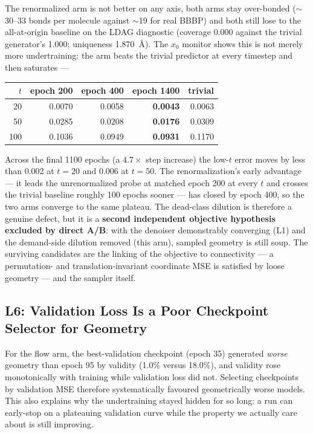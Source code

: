 \documentclass[12pt, a4paper]{article}
\begin{document}
The renormalized arm is not better on any axis, both arms stay over-bonded
($\sim$30--33 bonds per molecule against $\sim$19 for real BBBP) and both still
lose to the all-at-origin baseline on the LDAG diagnostic (coverage 0.000
against the trivial generator's 1.000; uniqueness 1.870~\AA{}). The $x_0$
monitor shows this is not merely more undertraining: the arm beats the trivial
predictor at every timestep and then saturates ---

\begin{center}
\begin{tabular}{rrrrr}
\toprule
$t$ & epoch 200 & epoch 400 & epoch 1400 & trivial \\
\midrule
20  & 0.0070 & 0.0058 & \textbf{0.0043} & 0.0063 \\
50  & 0.0285 & 0.0208 & \textbf{0.0176} & 0.0309 \\
100 & 0.1036 & 0.0949 & \textbf{0.0931} & 0.1170 \\
\bottomrule
\end{tabular}
\end{center}

Across the final 1100 epochs (a $4.7\times$ step increase) the low-$t$ error
moves by less than 0.002 at $t=20$ and 0.006 at $t=50$. The
renormalization's early advantage --- it leads the unrenormalized probe at
matched epoch 200 at every $t$ and crosses the trivial baseline roughly 100
epochs sooner --- has closed by epoch 400, so the two arms converge to the same
plateau. The dead-class dilution is therefore a genuine defect, but it is a
\textbf{second independent objective hypothesis excluded by direct A/B}: with
the denoiser demonstrably converging (L1) and the demand-side dilution removed
(this arm), sampled geometry is still soup. The surviving candidates are the
linking of the objective to connectivity --- a permutation- and
translation-invariant coordinate MSE is satisfied by loose geometry --- and the
sampler itself.

\subsection{L6: Validation Loss Is a Poor Checkpoint Selector for Geometry}

For the flow arm, the best-validation checkpoint (epoch 35) generated
\emph{worse} geometry than epoch 95 by validity (1.0\% versus 18.0\%), and
validity rose monotonically with training while validation loss did not.
Selecting checkpoints by validation MSE therefore systematically favoured
geometrically worse models. This also explains why the undertraining stayed
hidden for so long: a run can early-stop on a plateauing validation curve
while the property we actually care about is still improving.
\end{document}
